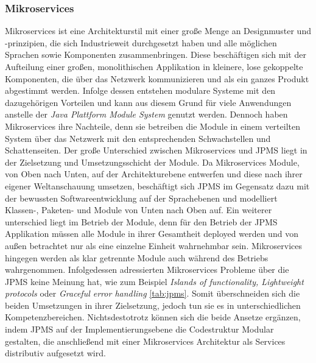 \subsubsection{Mikroservices}
  Mikroservices ist eine Architekturstil mit einer große Menge an Designmuster und -prinzipien, die sich Industrieweit durchgesetzt haben und alle möglichen Sprachen sowie Komponenten zusammenbringen. 
  Diese beschäftigen sich mit der Aufteilung einer großen, monolithischen Applikation in kleinere, lose gekoppelte Komponenten, die über das Netzwerk kommunizieren und als ein ganzes Produkt abgestimmt werden.
  Infolge dessen entstehen modulare Systeme mit den dazugehörigen Vorteilen und kann aus diesem Grund für viele Anwendungen anstelle der \textit{Java Plattform Module System} genutzt werden.
  Dennoch haben Mikroservices ihre Nachteile, denn sie betreiben die Module in einem verteilten System über das Netzwerk mit den entsprechenden Schwachstellen und Schattenseiten.
  \bigbreak Der große Unterschied zwischen Mikroservices und JPMS liegt in der Zielsetzung und Umsetzungsschicht der Module. 
  Da Mikroservices Module, von Oben nach Unten, auf der Architekturebene entwerfen und diese nach ihrer eigener Weltanschauung umsetzen, beschäftigt sich JPMS im Gegensatz dazu mit der bewussten Softwareentwicklung auf der Sprachebenen und modelliert Klassen-, Paketen- und Module von Unten nach Oben auf.
  Ein weiterer unterschied liegt im Betrieb der Module, denn für den Betrieb der JPMS Applikation müssen alle Module in ihrer Gesamtheit deployed werden und von außen betrachtet nur als eine einzelne Einheit wahrnehmbar sein. 
  Mikroservices hingegen werden als klar getrennte Module auch während des Betriebs wahrgenommen. 
  Infolgedessen adressierten Mikroservices Probleme über die JPMS keine Meinung hat, wie zum Beispiel \textit{Islands of functionality, Lightweight protocols} oder \textit{Graceful error handling} \ref{tab:jpms}. Somit überschneiden sich die beiden Umsetzungen in ihrer Zielsetzung, jedoch tun sie es in unterschiedlichen Kompetenzbereichen.  
  \bigbreak Nichtsdestotrotz können sich die beide Ansetze ergänzen, indem JPMS auf der Implementierungsebene die Codestruktur Modular gestalten, die anschließend mit einer Mikroservices Architektur als Services distributiv aufgesetzt wird. 



